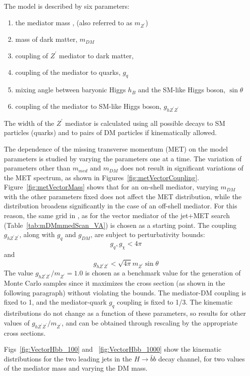 The model is described by six parameters:
\begin{enumerate}
	\item the mediator mass \mmed, (also referred to as $m_{Z^\prime}$)
	\item mass of dark matter, $m_{DM}$
	\item coupling of $Z^\prime$ mediator to dark matter, \gdm
	\item coupling of the mediator to quarks, $g_q$
	\item mixing angle between baryonic Higgs $h_B$ and the SM-like Higgs boson, $\sin\theta$
	\item coupling of the mediator to SM-like Higgs boson, $g_{hZ^\prime Z^\prime}$
\end{enumerate}
The width of the $Z^\prime$ mediator is calculated using all possible decays to SM particles (quarks) and to pairs of DM particles if kinematically allowed.

The dependence of the missing transverse momentum (MET) on the model parameters 
is studied by varying the parameters one at a time. The variation of parameters 
other than $m_{med}$ and $m_{DM}$ does not result in significant 
variations of the MET spectrum, as shown in Figures~\ref{fig:metVectorCoupling}. 
Figure~\ref{fig:metVectorMass} shows that for an on-shell mediator, 
varying $m_{DM}$ with the other parameters fixed does not affect the MET distribution, while 
the distribution broadens significantly in the case of an off-shell mediator. 
For this reason, the same grid in \mmed, \mdm as for the vector mediator
of the jet+MET search (Table~\ref{tab:mDMmmedScan_VA}) is chosen as a starting point. 
The coupling $g_{hZ^\prime Z^\prime}$, along with $g_q$ and $g_{DM}$, are subject to perturbativity bounds:
$$g_q, g_\chi < 4\pi $$ and $$  g_{h Z^\prime Z^\prime} < \sqrt{4\pi}m_{Z^\prime}\sin\theta$$ 
The value $g_{h Z^\prime Z^\prime}/m_{Z^\prime} = 1.0$ is chosen as a benchmark value for the generation 
of Monte Carlo samples since it maximizes the cross section (as shown in the following paragraph)
without violating the bounds. The mediator-DM coupling \gdm is fixed to 1, and  
the mediator-quark $g_{q}$ coupling is fixed to 1/3. 
The kinematic distributions do not change as a function of these parameters, so 
results for other values of  $g_{h Z^\prime Z^\prime}/m_{Z^\prime}$, \gdm and \gq can be 
obtained through rescaling by the appropriate cross sections. 

Figs~\ref{fig:VectorHbb_100} and ~\ref{fig:VectorHbb_1000} show the kinematic distributions for the two leading jets
in the $H \to \bar b b$ decay channel, for two values of the mediator mass and varying the DM mass.  

